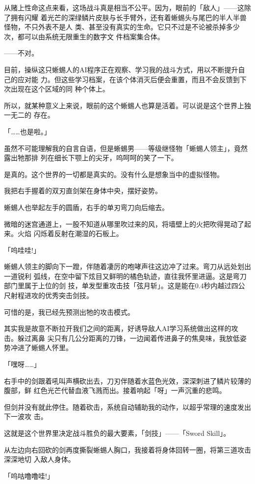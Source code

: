 \documentclass[11pt]{book}
\begin{document}
从赌上性命这点来看，这场战斗真是相当不公平。因为，眼前的「敌人」——这除了拥有闪耀
着光芒的深绿鳞片皮肤与长手臂外，还有着蜥蜴头与尾巴的半人半兽怪物，不只外表不是人
类、甚至没有真实的生命。它只不过是不论被杀掉多少次，都可以由系统无限重生的数字文
件档案集合体。

——不对。

目前，操纵这只蜥蜴人的AI程序正在观察、学习我的战斗方式，用以不断提升自己的应对能
力。但这些学习档案，在该个体消灭后便会重置，而且不会反馈到下次出现在这个区域的同
种个体上。

所以，就某种意义上来说，眼前的这个蜥蜴人也算是活着。可以说是这个世界上独一无二的
存在。

「……也是啦。」

虽然不可能理解我的自言自语，但是蜥蜴男——等级继怪物「蜥蜴人领主」，竟然露出牠那排
列在细长下颚上的尖牙，呜呵呵的笑了一下。

是真的。这个世界的一切都是真实的。没有什么是想象当中的虚拟怪物。

我把右手握着的双刃直剑架在身体中央，摆好姿势。

蜥蜴人也举起左手的圆盾，右手的单刃弯刀向后缩去。

微暗的迷宫通道上，一股不知道从哪里吹过来的风，将墙壁上的火把吹得晃动了起来。火焰
闪烁着反射在潮湿的石板上。

「呜哇哇!」

蜥蜴人领主的脚向下一蹬，伴随着凄厉的咆哮声往这边冲了过来。弯刀从远处划出一道锐利
弧线，在空中留下炫目又鲜明的橘色轨迹，直往我怀里进逼。这是弯刀部门里属于上位的剑
技，单发型重攻击技「弦月斩」。这是能在0.4秒内越过四公尺射程进攻的优秀突击剑技。

可惜的是，我已经先预测出牠的攻击模式。

其实我是故意不断拉开我们之间的距离，好诱导敌人AI学习系统做出这样的攻击。躲过离鼻
尖只有几公分距离的刀锋，一边闻着传进鼻子的焦臭味，我放低姿势冲进了蜥蜴人怀里。

「嘿呀……」

右手中的剑跟着吼叫声横砍出去，刀刃伴随着水蓝色光效，深深刺进了鳞片较薄的腹部，鲜
红色光芒代替血液飞溅而出。接着响起「呀」一声沉重的悲鸣。

但剑并没有就此停住。随着砍击，系统自动辅助我的动作，以超乎常理的速度发出下一波攻
击。

这就是这个世界里决定战斗胜负的最大要素，「剑技」——「Sword Skill」。

从左边向右回砍的剑再度撕裂蜥蜴人胸口，我接着将身体回转一圈，将第三道攻击深深地切
入敌人身体。

「呜咕噜噜哇!」
\end{document}
